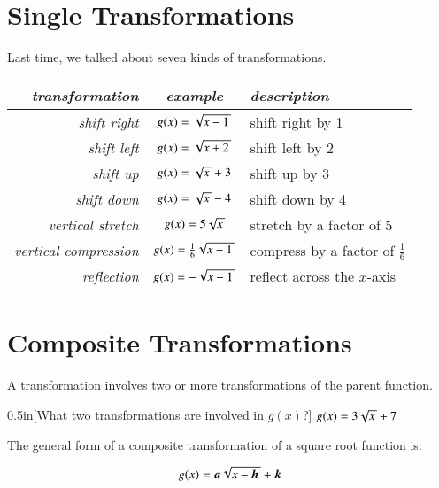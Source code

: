 \section{Single Transformations}

Last time, 
we talked about seven kinds of transformations.

\begin{center}
\begin{tabular}{r||c|l}
    {\bfseries\itshape transformation} & {\bfseries\itshape example} & {\bfseries\itshape description}\\
    \midrule
    {\itshape shift right}          & $g(x) = \myRoot{x-1}$ & shift right by 1\\
    {\itshape shift left}           & $g(x) = \myRoot{x+2}$ & shift left by 2\\
    {\itshape shift up}             & $g(x) = \myRoot{x}+3$ & shift up by 3\\
    {\itshape shift down}           & $g(x) = \myRoot{x}-4$ & shift down by 4\\
    {\itshape vertical stretch}     & $g(x) = 5\myRoot{x}$  & stretch by a factor of 5\\
    {\itshape vertical compression} & $g(x) = \frac{1}{6}\myRoot{x-1}$ & compress by a factor of $\frac{1}{6}$\\
    {\itshape reflection}           & $g(x) = -\myRoot{x-1}$ & reflect across the $x$-axis\\
\end{tabular}
\end{center}

\section{Composite Transformations}

A  transformation involves two or more transformations of the parent function.

\begin{myProblem}[\normalsize]{0.5in}[What two transformations are involved in $g(x)$?]{
    $g(x) = 3 \myRoot{x} + 7$
    }
\end{myProblem}

The general form of a composite transformation of a square root function is:

{\centering
\begin{tcolorbox}[width=3in]
    \large%
    \[   g(x) = {\boldsymbol a} \myRoot{x-{\boldsymbol h}} + {\boldsymbol k}   \]
\end{tcolorbox}
}

